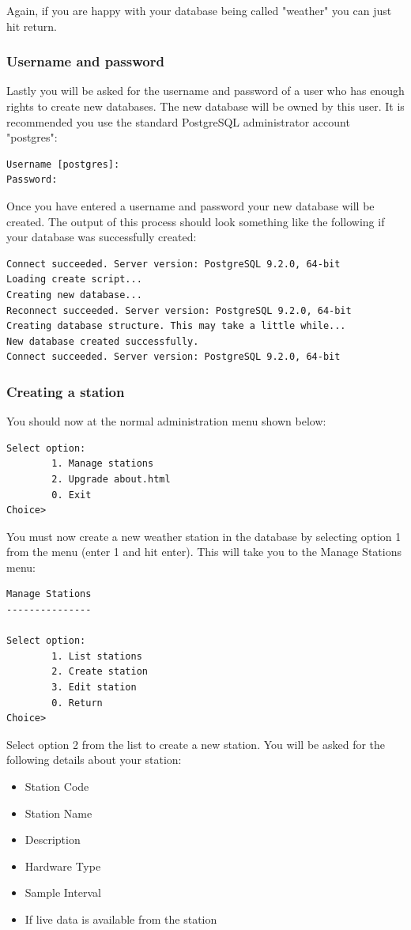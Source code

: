 \documentclass[a4paper,10pt,draft]{book}
\begin{document}
Again, if you are happy with your database being called "weather" you can just hit return.

\subsubsection{Username and password}
Lastly you will be asked for the username and password of a user who has enough rights to create new databases. The new database will be owned by this user. It is recommended you use the standard PostgreSQL administrator account "postgres":
\begin{verbatim}
Username [postgres]:
Password:
\end{verbatim}

Once you have entered a username and password your new database will be created. The output of this process should look something like the following if your database was successfully created:
\begin{verbatim}
Connect succeeded. Server version: PostgreSQL 9.2.0, 64-bit
Loading create script...
Creating new database...
Reconnect succeeded. Server version: PostgreSQL 9.2.0, 64-bit
Creating database structure. This may take a little while...
New database created successfully.
Connect succeeded. Server version: PostgreSQL 9.2.0, 64-bit
\end{verbatim}

\subsubsection{Creating a station}

You should now at the normal administration menu shown below:
\begin{verbatim}
Select option:
        1. Manage stations
        2. Upgrade about.html
        0. Exit
Choice>
\end{verbatim}

You must now create a new weather station in the database by selecting option 1 from the menu (enter 1 and hit enter). This will take you to the Manage Stations menu:

\begin{verbatim}
Manage Stations
---------------

Select option:
        1. List stations
        2. Create station
        3. Edit station
        0. Return
Choice>
\end{verbatim}

Select option 2 from the list to create a new station. You will be asked for the following details about your station:
\begin{itemize}
\item Station Code
\item Station Name
\item Description
\item Hardware Type
\item Sample Interval
\item If live data is available from the station
\end{itemize}
\end{document}

